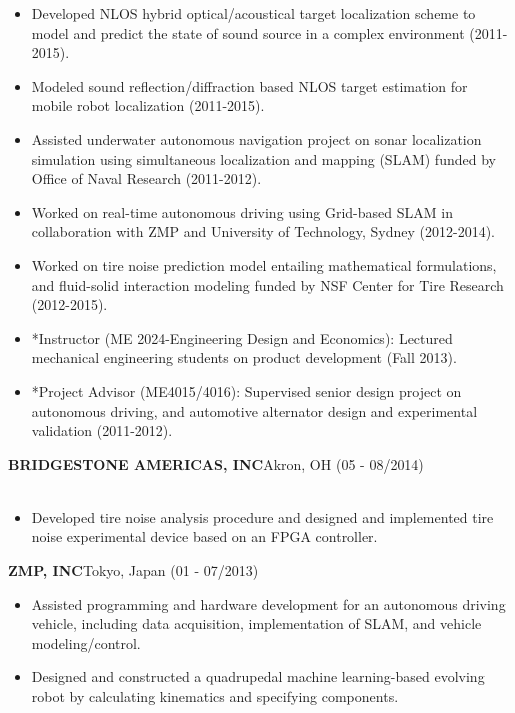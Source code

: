 \documentclass[11pt,letterpaper]{article}
\begin{document}
  \begin{itemize}
  \item Developed NLOS hybrid optical/acoustical target localization scheme to model and predict the state of sound source in a complex environment (2011-2015).
  \item Modeled sound reflection/diffraction based NLOS target estimation for mobile robot localization (2011-2015).
  \item Assisted underwater autonomous navigation project on sonar localization simulation using simultaneous localization and mapping (SLAM) funded by Office of Naval Research (2011-2012).
  \item Worked on real-time autonomous driving using Grid-based SLAM in collaboration with ZMP and University of Technology, Sydney (2012-2014).
  \item Worked on tire noise prediction model entailing mathematical formulations, and fluid-solid interaction modeling funded by NSF Center for Tire Research (2012-2015).
  \item *Instructor (ME 2024-Engineering Design and Economics): Lectured mechanical engineering students on product development (Fall 2013).
  \item *Project Advisor (ME4015/4016): Supervised senior design project on autonomous driving, and automotive alternator design and experimental validation (2011-2012).
  \end{itemize}

  \MakeUppercase{\bf Bridgestone Americas, Inc}\hfill{Akron, OH}{ (05 - 08/2014)}\\
  \\
  \begin{itemize}
  \item Developed tire noise analysis procedure and designed and implemented tire noise experimental device based on an FPGA controller.
  \end{itemize}

  \MakeUppercase{\bf ZMP, Inc}\hfill{Tokyo, Japan }{(01 - 07/2013)}\\
  \begin{itemize}
  \item Assisted programming and hardware development for an autonomous driving vehicle, including data acquisition, implementation of SLAM, and vehicle modeling/control.
  \item Designed and constructed a quadrupedal machine learning-based evolving robot by calculating kinematics and specifying components.
  \end{itemize}
\end{document}

